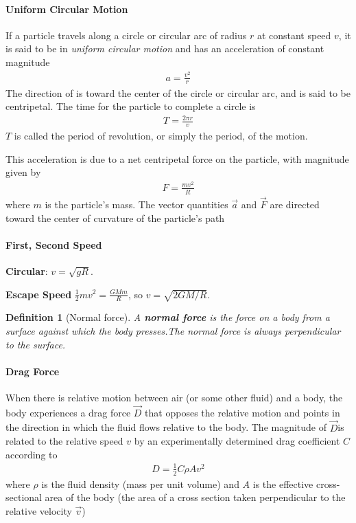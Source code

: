 \documentclass{article}
\numberwithin{equation}{subsection} %
\newtheorem{defi}{Definition}[section]
\theoremstyle{definition}
\begin{document}
\paragraph{Uniform Circular Motion} If a particle travels along a circle
or circular arc of radius $r$ at constant speed $v$, it is said to be in
\textit{uniform circular motion} and has an acceleration of constant
magnitude
\begin{align}
    a = \frac{v^2}{r}
\end{align}
The direction of is toward the center of the circle or circular arc,
and is said to be centripetal. The time for the particle to complete
a circle is
\begin{align}
    T=\frac{2\pi r}{v}
\end{align}
$T$ is called the period of revolution, or simply the period, of the
motion.

This acceleration is due to a net centripetal force on the particle,
with magnitude given by
\begin{align}
    F = \frac{mv^2}{R}
\end{align}
where $m$ is the particle’s mass. The vector quantities $\vec a$ and
$\vec F$ are directed toward the center of curvature of the particle’s
path

\paragraph{First, Second Speed}

\textbf{Circular}: $v = \sqrt{gR}$.

\textbf{Escape Speed} $\frac{1}{2}mv^2 = \frac{GMm}{R}$, so
$v=\sqrt{2GM/R}$.
\begin{defi}[Normal force]
A \textbf{normal force} is the force on a body from a surface against
which the body presses.The normal force is always perpendicular to the
surface.
\end{defi}

\paragraph{Drag Force} When there is relative motion between air (or
some other fluid) and a body, the body experiences a drag force $\vec
D$
that opposes the relative motion and points in the direction in
which the fluid flows relative to the body. The magnitude of $\vec D$is
related to the relative speed $v$ by an experimentally determined
drag coefficient $C$ according to
\begin{align}
    D=\frac{1}{2} C\rho A v^2
\end{align}
where $\rho$ is the fluid density (mass per unit volume) and $A$ is
the effective cross-sectional area of the body (the area of a cross
section taken perpendicular to the relative velocity $\vec v$)
\end{document}
